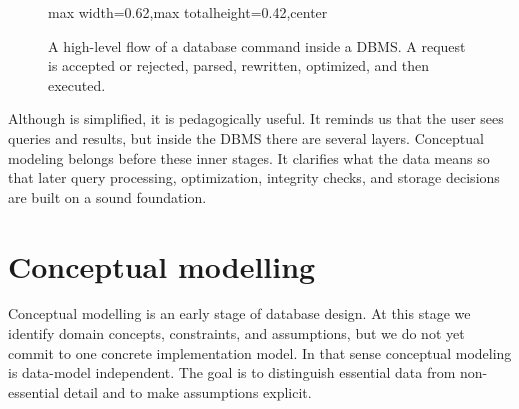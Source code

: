 \documentclass[11pt,a4paper,openany]{book}
\begin{document}
\begin{figure}[tbp]
\centering
\begin{adjustbox}{max width=0.62\linewidth,max totalheight=0.42\textheight,center}
\end{adjustbox}
\caption{A high-level flow of a database command inside a DBMS. A request is accepted or rejected, parsed, rewritten, optimized, and then executed.}
\label{fig:dbms-command-flow}
\end{figure}

Although  is simplified, it is pedagogically useful. It reminds us that the user sees queries and results, but inside the DBMS there are several layers. Conceptual modeling belongs before these inner stages. It clarifies what the data means so that later query processing, optimization, integrity checks, and storage decisions are built on a sound foundation.

\section{Conceptual modelling}
Conceptual modelling is an early stage of database design. At this stage we identify domain concepts, constraints, and assumptions, but we do not yet commit to one concrete implementation model. In that sense conceptual modeling is data-model independent. The goal is to distinguish essential data from non-essential detail and to make assumptions explicit.
\end{document}
